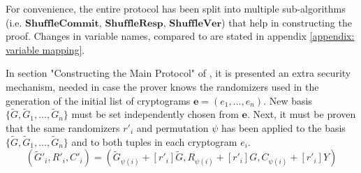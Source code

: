 


For convenience, the entire protocol has been split into multiple sub-algorithms (i.e. $\mathbf{ShuffleCommit}$, $\mathbf{ShuffleResp}$, $\mathbf{ShuffleVer}$) that help in constructing the proof. 
Changes in variable names, compared to \cite{Furukawa01} are stated in appendix \ref{appendix: variable mapping}.


In section "Constructing the Main Protocol" of \cite{Furukawa01}, it is presented an extra security mechanism, needed in case the prover knows the randomizers used in the generation of the initial list of cryptograms \( \boldsymbol{e} = (e_1, ..., e_n) \). New basis \( \{ \tilde{G}, \tilde{G}_1, ..., \tilde{G}_n \} \) must be set independently chosen from $\boldsymbol{e}$. Next, it must be proven that the same randomizers $r'_i$ and permutation $\psi$ has been applied to the basis \( \{ \tilde{G}, \tilde{G}_1, ..., \tilde{G}_n \} \) and to both tuples in each cryptogram $e_i$.
\[ (\tilde{G}'_i, R'_i, C'_i) = (\tilde{G}_{\psi(i)} + [r'_i]\tilde{G}, R_{\psi(i)} + [r'_i]G, C_{\psi(i)} + [r'_i]Y) \]

